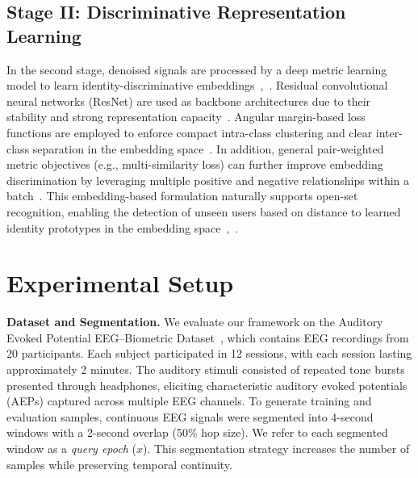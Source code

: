 \documentclass[conference]{IEEEtran}
\begin{document}
\subsection{Stage II: Discriminative Representation Learning}

In the second stage, denoised signals are processed by a deep metric learning model to learn identity-discriminative embeddings~\cite{b5},~\cite{b6}. Residual convolutional neural networks (ResNet) are used as backbone architectures due to their stability and strong representation capacity~\cite{b11}. Angular margin-based loss functions are employed to enforce compact intra-class clustering and clear inter-class separation in the embedding space~\cite{b7}. In addition, general pair-weighted metric objectives (e.g., multi-similarity loss) can further improve embedding discrimination by leveraging multiple positive and negative relationships within a batch~\cite{b8}. This embedding-based formulation naturally supports open-set recognition, enabling the detection of unseen users based on distance to learned identity prototypes in the embedding space~\cite{b5},~\cite{b6}.

\section{Experimental Setup}

\textbf{Dataset and Segmentation.} We evaluate our framework on the Auditory Evoked Potential EEG--Biometric Dataset~\cite{b4}, which contains EEG recordings from 20 participants. Each subject participated in 12 sessions, with each session lasting approximately 2 minutes. The auditory stimuli consisted of repeated tone bursts presented through headphones, eliciting characteristic auditory evoked potentials (AEPs) captured across multiple EEG channels. To generate training and evaluation samples, continuous EEG signals were segmented into 4-second windows with a 2-second overlap (50\% hop size). We refer to each segmented window as a \textit{query epoch} ($x$). This segmentation strategy increases the number of samples while preserving temporal continuity.
\end{document}
